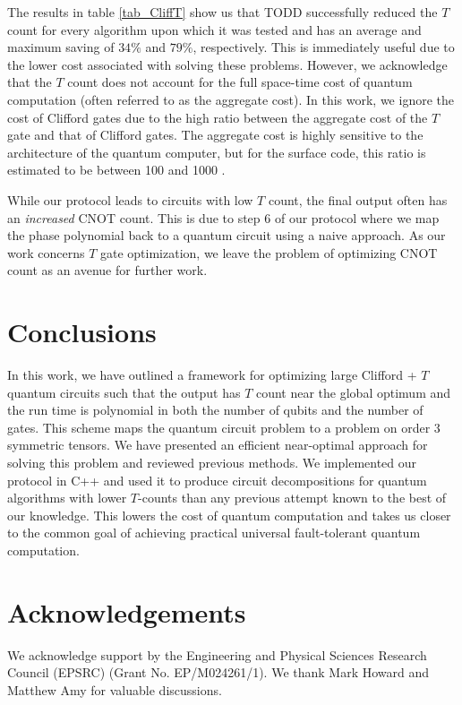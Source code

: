 \documentclass[notitlepage]{article}
\theoremstyle{definition}
\theoremstyle{problem}
\theoremstyle{lemma}
\begin{document}
	The results in table \ref{tab_CliffT} show us that TODD successfully reduced the $T$ count for every algorithm upon which it was tested and has an average and maximum saving of $34\%$ and $79\%$, respectively. This is immediately useful due to the lower cost associated with solving these problems. However, we acknowledge that the $T$ count does not account for the full space-time cost of quantum computation (often referred to as the aggregate cost). In this work, we ignore the cost of Clifford gates due to the high ratio between the aggregate cost of the $T$ gate and that of Clifford gates. The aggregate cost is highly sensitive to the architecture of the quantum computer, but for the surface code, this ratio is estimated to be between 100 and 1000 \cite{raus,ogor,fowl}.

While our protocol leads to circuits with low $T$ count, the final output often has an \emph{increased} CNOT count. This is due to step 6 of our protocol where we map the phase polynomial back to a quantum circuit using a naive approach. As our work concerns $T$ gate optimization, we leave the problem of optimizing CNOT count as an avenue for further work.

	\section{Conclusions}
	\label{s_d_and_c}
	In this work, we have outlined a framework for optimizing large Clifford + $T$ quantum circuits such that the output has $T$ count near the global optimum and the run time is polynomial in both the number of qubits and the number of gates. This scheme maps the quantum circuit problem to a problem on order 3 symmetric tensors. We have presented an efficient near-optimal approach for solving this problem and reviewed previous methods. We implemented our protocol in C++ and used it to produce circuit decompositions for quantum algorithms with lower $T$-counts than any previous attempt known to the best of our knowledge. This lowers the cost of quantum computation and takes us closer to the common goal of achieving practical universal fault-tolerant quantum computation.
	

	\section{Acknowledgements}
	We acknowledge support by the Engineering and Physical Sciences Research Council (EPSRC) (Grant No. EP/M024261/1). We thank Mark Howard and Matthew Amy for valuable discussions.
\end{document}
